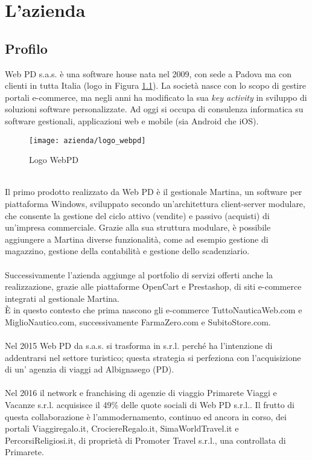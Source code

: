 
\chapter{L'azienda}
\label{cap:processi-metodologie}

\section{Profilo}
Web PD s.a.s. è una software house nata nel 2009, con sede a Padova ma con clienti in tutta Italia (logo in Figura \ref{figura:logo-webpd}). La società nasce con lo scopo di gestire portali e-commerce, ma negli anni ha modificato la sua \textit{key activity} in sviluppo di soluzioni software personalizzate. Ad oggi si occupa di consulenza informatica su software gestionali, applicazioni web e mobile (sia Android che iOS).\\
\begin{figure}[!h] 
	\centering 
	\texttt{[image: azienda/logo\_webpd]} 
	\caption{Logo WebPD}
	\label{figura:logo-webpd}
\end{figure}
\\
Il primo prodotto realizzato da Web PD è il gestionale Martina, un software per piattaforma Windows, sviluppato secondo un’architettura client-server modulare, che consente la gestione del ciclo attivo (vendite) e passivo (acquisti) di un’impresa commerciale. Grazie alla sua struttura modulare, è possibile aggiungere a Martina diverse funzionalità, come ad esempio gestione di magazzino, gestione della contabilità e
gestione dello scadenziario.\\
\\
Successivamente l’azienda aggiunge al portfolio di servizi offerti anche la realizzazione, grazie alle piattaforme OpenCart e Prestashop, di siti e-commerce integrati al gestionale Martina. \\
È in questo contesto che prima nascono gli e-commerce TuttoNauticaWeb.com e MiglioNautico.com, successivamente FarmaZero.com e SubitoStore.com.\\
\\
Nel 2015 Web PD da s.a.s. si trasforma in s.r.l. perché ha l’intenzione di addentrarsi nel settore turistico; questa strategia si perfeziona con l’acquisizione di un' agenzia di viaggi ad Albignasego (PD).\\
\\
Nel 2016 il network e franchising di agenzie di viaggio Primarete Viaggi e Vacanze s.r.l. acquisisce il 49\% delle quote sociali di Web PD s.r.l.. Il frutto di questa collaborazione è l’ammodernamento, continuo ed ancora in corso, dei portali Viaggiregalo.it, CrociereRegalo.it, SimaWorldTravel.it e PercorsiReligiosi.it, di proprietà di Promoter Travel s.r.l., una controllata di Primarete.\\

